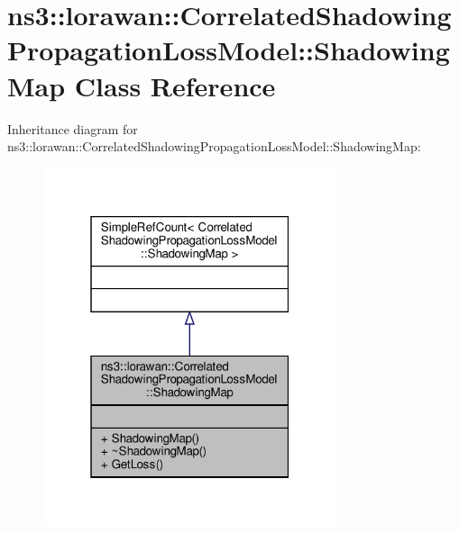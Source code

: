 \hypertarget{classns3_1_1lorawan_1_1CorrelatedShadowingPropagationLossModel_1_1ShadowingMap}{}\section{ns3\+:\+:lorawan\+:\+:Correlated\+Shadowing\+Propagation\+Loss\+Model\+:\+:Shadowing\+Map Class Reference}
\label{classns3_1_1lorawan_1_1CorrelatedShadowingPropagationLossModel_1_1ShadowingMap}


Inheritance diagram for ns3\+:\+:lorawan\+:\+:Correlated\+Shadowing\+Propagation\+Loss\+Model\+:\+:Shadowing\+Map\+:
\nopagebreak
\begin{figure}[H]
\begin{center}
\leavevmode
\includegraphics[width=244pt]{classns3_1_1lorawan_1_1CorrelatedShadowingPropagationLossModel_1_1ShadowingMap__inherit__graph}
\end{center}
\end{figure}


